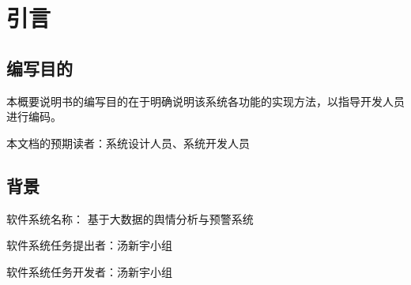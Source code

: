 \section{引言}

\subsection{编写目的}
本概要说明书的编写目的在于明确说明该系统各功能的实现方法，以指导开发人员进行编码。

本文档的预期读者：系统设计人员、系统开发人员
\subsection{背景}
软件系统名称： 基于大数据的舆情分析与预警系统

软件系统任务提出者：汤新宇小组

软件系统任务开发者：汤新宇小组